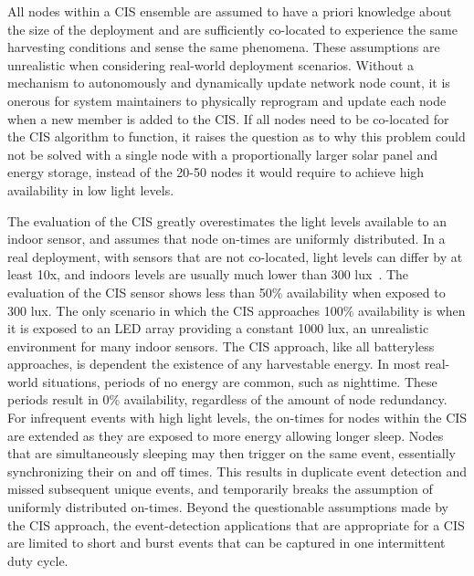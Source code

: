 All nodes within a CIS ensemble are assumed to have a priori knowledge about the size of the deployment and are sufficiently co-located to experience the same harvesting conditions and sense the same phenomena.
These assumptions are unrealistic when considering real-world deployment scenarios.
Without a mechanism to autonomously and dynamically update network node count, it is onerous for system maintainers to physically reprogram and update each node when a new member is added to the CIS.
If all nodes need to be co-located for the CIS algorithm to function, it raises the question as to why this problem could not be solved with a single node with a proportionally larger solar panel and energy storage, instead of the 20-50 nodes it would require to achieve high availability in low light levels.

The evaluation of the CIS greatly overestimates the light levels available to an indoor sensor,
and assumes that node on-times are uniformly distributed.
In a real deployment, with sensors that are not co-located, light levels can differ by at least 10x,
and indoors levels are usually much lower than 300 lux~\cite{yervaGrafting12}.
The evaluation of the CIS sensor shows less than 50\% availability when exposed to 300 lux. The only scenario in which the CIS approaches 100\% availability is when it is exposed to an LED array providing a constant 1000 lux, an unrealistic environment for many indoor sensors.
The CIS approach, like all batteryless approaches, is dependent the existence of any harvestable energy.
In most real-world situations, periods of no energy are common, such as nighttime. These periods result in 0\% availability, regardless of the amount of node redundancy.
For infrequent events with high light levels, the on-times for nodes within the CIS are extended as they are exposed to more energy allowing longer sleep. Nodes that are simultaneously sleeping may then trigger on the same event, essentially synchronizing their on and off times. This results in duplicate event detection and missed subsequent unique events, and temporarily breaks the assumption of uniformly distributed on-times.
Beyond the questionable assumptions made by the CIS approach, the event-detection applications that are appropriate for a CIS are limited to short and burst events that can be captured in one intermittent duty cycle.

